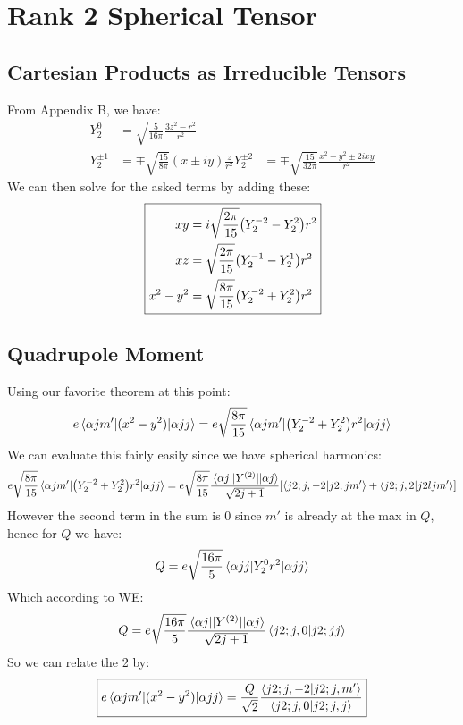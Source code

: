 \documentclass[12pt]{article}
\begin{document}
\section{Rank 2 Spherical Tensor}
\subsection{Cartesian Products as Irreducible Tensors}
From Appendix B, we have:
\begin{align*}
  Y_2^0&=\sqrt{\frac{5}{16\pi}}\frac{3z^2-r^2}{r^2}\\
  Y_2^{\pm1}&=\mp\sqrt{\frac{15}{8\pi}}(x\pm iy)\frac{z}{r^2}
  Y_2^{\pm2}&=\mp\sqrt{\frac{15}{32\pi}}\frac{x^2-y^2\pm2ixy}{r^2}
\end{align*}
We can then solve for the asked terms by adding these:
\begin{equation}
  \boxed{
  \begin{aligned}
    xy &= i\sqrt{\frac{2\pi}{15}}\qty(Y_2^{-2}-Y_2^2)r^2\\
    xz &= \sqrt{\frac{2\pi}{15}}\qty(Y_2^{-1}-Y_2^1)r^2\\
    x^2-y^2 &= \sqrt{\frac{8\pi}{15}}\qty(Y_2^{-2}+Y_2^2)r^2
  \end{aligned}}
\end{equation}

\subsection{Quadrupole Moment}
Using our favorite theorem at this point:
\begin{align*}
  e\mel{\alpha jm'}{(x^2-y^2)}{\alpha jj}=
  e\sqrt{\frac{8\pi}{15}}\mel{\alpha j m'}{\qty(Y_2^{-2}+Y_2^2)r^2}{\alpha jj}
\end{align*}
We can evaluate this fairly easily since we have spherical harmonics:
\begin{align*}
  e\sqrt{\frac{8\pi}{15}}\mel{\alpha j m'}{\qty(Y_2^{-2}+Y_2^2)r^2}{\alpha jj}
  =e\sqrt{\frac{8\pi}{15}}
  \frac{\mel{\alpha j}{|Y^{(2)}|}{\alpha j}}{\sqrt{2j+1}}
  \qty[\ip{j2;j,-2}{j2;jm'}+\ip{j2;j,2}{j2ljm'}]
\end{align*}
However the second term in the sum is 0 since $m'$ is already at the max in $Q$, hence for $Q$ we have:
\begin{align*}
  Q=e\sqrt{\frac{16\pi}{5}}\mel{\alpha jj}{Y_2^0r^2}{\alpha jj}
\end{align*}
Which according to WE:
\begin{align*}
  Q=e\sqrt{\frac{16\pi}{5}}
  \frac{\mel{\alpha j}{|Y^{(2)}|}{\alpha j}}{\sqrt{2j+1}}
  \ip{j2;j,0}{j2;jj}
\end{align*}
So we can relate the 2 by:
\begin{equation}
  \boxed{e\mel{\alpha jm'}{(x^2-y^2)}{\alpha jj}
  =\frac{Q}{\sqrt{2}}\frac{\ip{j2;j,-2}{j2;j,m'}}{\ip{j2;j,0}{j2;j,j}}}
\end{equation}
\end{document}
